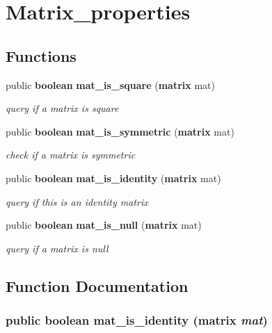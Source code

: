 \section{Matrix\_\-properties}
\label{group__matrix__properties}
\subsection*{Functions}
\begin{CompactItemize}
\item 
public {\bf boolean} {\bf mat\_\-is\_\-square} ({\bf matrix} mat)
\begin{CompactList}\small\item\em query if a matrix is square\item\end{CompactList}\item 
public {\bf boolean} {\bf mat\_\-is\_\-symmetric} ({\bf matrix} mat)
\begin{CompactList}\small\item\em check if a matrix is symmetric\item\end{CompactList}\item 
public {\bf boolean} {\bf mat\_\-is\_\-identity} ({\bf matrix} mat)
\begin{CompactList}\small\item\em query if this is an identity matrix\item\end{CompactList}\item 
public {\bf boolean} {\bf mat\_\-is\_\-null} ({\bf matrix} mat)
\begin{CompactList}\small\item\em query if a matrix is null\item\end{CompactList}\end{CompactItemize}


\subsection{Function Documentation}
\subsubsection{\setlength{\rightskip}{0pt plus 5cm}public {\bf boolean} mat\_\-is\_\-identity ({\bf matrix} {\em mat})}\label{group__matrix__properties_a2}


